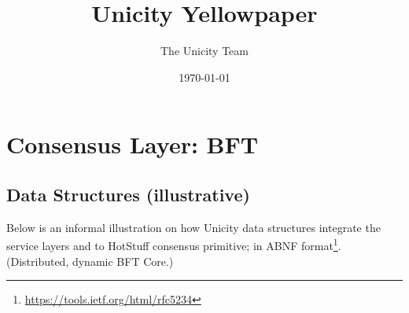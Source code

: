 \documentclass{common/template}
\title{Unicity Yellowpaper}
\author{The Unicity Team}
\date{\today}
\newenvironment{leveldown}%
  {\let\chapter\section%
   \let\section\subsection%
   \let\subsection\subsubsection%
   \let\subsubsection\paragraph%
   \let\paragraph\subparagraph%
  }{}
\begin{document}
\maketitle

\pagebreak
\setcounter{tocdepth}{4}
\makeatletter
\renewcommand\@pnumwidth{0.7cm} %
\makeatother
\tableofcontents*{}

%







\chapter{Consensus Layer: BFT}
\begin{leveldown}
  
\end{leveldown}

% 

%   

\appendix







\chapter{Data Structures (illustrative)}

Below is an informal illustration on how Unicity data structures integrate the service layers and to HotStuff consensus primitive; in ABNF format\footnote{\url{https://tools.ietf.org/html/rfc5234}}. (Distributed, dynamic BFT Core.)




\clearpage
{}
\printindex
\end{document}
